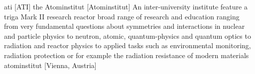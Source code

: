 \newglsXinstitution%
{ati}%
[ATI]%
{the Atominstitut}%
[Atominstitut]%
{An inter-university institute feature a \gls{triga} Mark II research reactor broad range of research and education ranging from very fundamental questions about symmetries and interactions in nuclear and particle physics to neutron, atomic, quantum-physics and quantum optics to radiation and reactor physics to applied tasks such as environmental monitoring, radiation protection or for example the radiation resistance of modern materials \cite{website:ATI}}%
{atominstitut}%
[Vienna, Austria]%